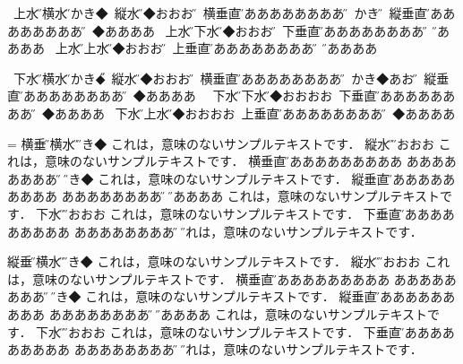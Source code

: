 \vfill\eject
{}
\leavevmode
\hbox{\utod
上水平\H\vrule \hbox{\yoko 横水平\H }\vrule かき◆\vrule
\hbox{\tate 縦水平\H }\vrule◆おおおお\H\vrule
\vbox{\yoko\hsize=30mm 横垂直\H ああああああああああ\hfill\H}\vrule
かき◆\H\vrule
\vbox{\tate\hsize=30mm 縦垂直\H ああああああああああ\hfill\H}\vrule
◆ああああ}
\hbox{\utod
上水平\H\vrule\hbox{\dtou 下水平\H }\vrule ◆おおおお\H\vrule
\vbox{\dtou\hsize=30mm 下垂直\H ああああああああああ\hfill\H}%
\vrule\H ◆ああああ}
\hbox{\utod
上水平\H\vrule\hbox{\utod 上水平\H }\vrule ◆おおおお\H\vrule
\vbox{\utod\hsize=30mm 上垂直\H ああああああああああ\hfill\H}%
\vrule\H ◆ああああ}

\vfill\eject


\leavevmode
\hbox{\dtou
下水平\H\vrule\hbox{\yoko 横水平\H }\vrule かき◆\H\vrule
\hbox{\tate 縦水平\H }\vrule ◆おおおお\H\vrule
\vbox{\yoko\hsize=30mm 横垂直\H ああああああああああ\hfill\H}%
\vrule かき◆あおう\H\vrule
\vbox{\tate\hsize=30mm 縦垂直\H ああああああああああ\hfill\H}%
\vrule ◆ああああ
}
\hbox{\dtou
下水平\H\vrule\hbox{\dtou 下水平\H }\vrule◆おおおお\vrule
\vbox{\dtou\hsize=30mm 下垂直\H ああああああああああ\hfill\H}%
\vrule ◆ああああ}
\hbox{\dtou
下水平\H\vrule\hbox{\utod 上水平\H }\vrule◆おおおお\vrule
\vbox{\utod\hsize=30mm 上垂直\H ああああああああああ\hfill\H}%
\vrule ◆ああああ}


\vfill\eject


=\vbox{\yoko\hsize=100mm
横垂直\H\vrule \hbox{\yoko 横水平\H }\vrule\H かき◆
これは，意味のないサンプルテキストです．
\vrule\hbox{\tate 縦水平\H }\vrule\H おおおお
これは，意味のないサンプルテキストです．\vrule
\vbox{\yoko\hsize=50mm 横垂直\H ああああああああああ%
  あああああああああ\hfill\H}%
\vrule\H かき◆
これは，意味のないサンプルテキストです．\vrule
\vbox{\tate\hsize=50mm 縦垂直\H ああああああああああ%
  あああああああああ\hfill\H}%
\vrule\H ◆ああああ
これは，意味のないサンプルテキストです．\vrule
\hbox{\dtou 下水平\H }\vrule\H おおおお
これは，意味のないサンプルテキストです．
\vrule\vbox{\dtou\hsize=50mm 下垂直\H ああああああああああ%
  あああああああああ\hfill\H}%
\vrule\H これは，意味のないサンプルテキストです．
}
\vfill\eject

\vbox{\tate\hsize=100mm
縦垂直\H\vrule\hbox{\yoko 横水平\H }\vrule\H かき◆
これは，意味のないサンプルテキストです．
\vrule\hbox{\tate 縦水平\H }\vrule\H おおおお
これは，意味のないサンプルテキストです．\vrule
\vbox{\yoko\hsize=50mm 横垂直\H ああああああああああ%
  あああああああああ\hfill\H}%
\vrule\H かき◆
これは，意味のないサンプルテキストです．\vrule
\vbox{\tate\hsize=50mm 縦垂直\H ああああああああああ%
  あああああああああ\hfill\H}%
\vrule\H ◆ああああ
これは，意味のないサンプルテキストです．\vrule
\hbox{\dtou 下水平\H }\vrule\H おおおお
これは，意味のないサンプルテキストです．
\vrule\vbox{\dtou\hsize=50mm 下垂直\H ああああああああああ%
  あああああああああ\hfill\H}%
\vrule\H これは，意味のないサンプルテキストです．
}
\vfill\eject

